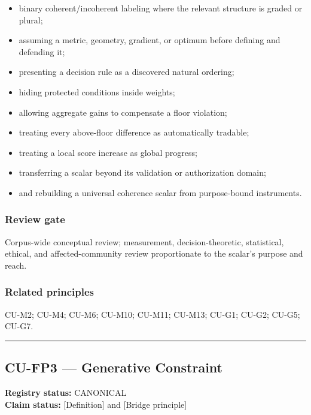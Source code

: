 \documentclass[
  11pt,
]{article}
\providecommand{\tightlist}{%
  \setlength{\itemsep}{0pt}\setlength{\parskip}{0pt}}
\begin{document}
\begin{itemize}
\tightlist
\item
  binary coherent/incoherent labeling where the relevant structure is
  graded or plural;
\item
  assuming a metric, geometry, gradient, or optimum before defining and
  defending it;
\item
  presenting a decision rule as a discovered natural ordering;
\item
  hiding protected conditions inside weights;
\item
  allowing aggregate gains to compensate a floor violation;
\item
  treating every above-floor difference as automatically tradable;
\item
  treating a local score increase as global progress;
\item
  transferring a scalar beyond its validation or authorization domain;
\item
  and rebuilding a universal coherence scalar from purpose-bound
  instruments.
\end{itemize}

\subsubsection{Review gate}\label{review-gate}

Corpus-wide conceptual review; measurement, decision-theoretic,
statistical, ethical, and affected-community review proportionate to the
scalar's purpose and reach.

\subsubsection{Related principles}\label{related-principles}

CU-M2; CU-M4; CU-M6; CU-M10; CU-M11; CU-M13; CU-G1; CU-G2; CU-G5; CU-G7.

\begin{center}\rule{0.5\linewidth}{0.5pt}\end{center}

\subsection{CU-FP3 --- Generative
Constraint}\label{cu-fp3-generative-constraint}

\textbf{Registry status:} CANONICAL\\
\textbf{Claim status:} {[}Definition{]} and {[}Bridge principle{]}
\end{document}
